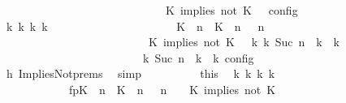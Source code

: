\begin{isabellebody}
\ \ \ \ \ \ \ \ \ \ \ \ \ \ \ \ \ \ \ \ \ \ \ \ \ \ {\isasymturnstile}\ {\isasymPsi}\ {\isasymtriangleright}\ {\isacharparenleft}{\isacharparenleft}K\ implies\ not\ K\ {\isacharhash}\ {\isasymPhi}{\isacharparenright}\ {\isasymrbrakk}\isactrlsub c\isactrlsub o\isactrlsub n\isactrlsub f\isactrlsub i\isactrlsub g{\isacartoucheclose}\isanewline
\ \ \ \ \ \ \ \ \isamarkupfalse%
\ \isamarkupfalse%
\ {\isacartoucheopen}{\isasymexists}{\isasymGamma}\isactrlsub k\ {\isasymPsi}\isactrlsub k\ {\isasymPhi}\isactrlsub k\ k{\isachardot}\ {\isacharparenleft}\isanewline
\ \ \ \ \ \ \ \ \ \ \ \ \ \ \ \ \ \ \ \ \ {\isacharparenleft}{\isacharparenleft}{\isacharparenleft}K\ {\isasymUp}\ n{\isacharparenright}\ {\isacharhash}\ {\isacharparenleft}K\ {\isasymnot}{\isasymUp}\ n{\isacharparenright}\ {\isacharhash}\ {\isasymGamma}{\isacharparenright}{\isacharcomma}\ n\isanewline
\ \ \ \ \ \ \ \ \ \ \ \ \ \ \ \ \ \ \ \ \ \ \ {\isasymturnstile}\ {\isasymPsi}\ {\isasymtriangleright}\ {\isacharparenleft}{\isacharparenleft}K\ implies\ not\ K\ {\isacharhash}\ {\isasymPhi}{\isacharparenright}{\isacharparenright}\ {\isasymhookrightarrow}\isactrlbsup k\isactrlesup \ {\isacharparenleft}{\isasymGamma}\isactrlsub k{\isacharcomma}\ Suc\ n\ {\isasymturnstile}\ {\isasymPsi}\isactrlsub k\ {\isasymtriangleright}\ {\isasymPhi}\isactrlsub k{\isacharparenright}\isanewline
\ \ \ \ \ \ \ \ \ \ \ \ \ \ \ \ \ \ \ \ {\isacharparenright}\ {\isasymand}\ {\isasymrho}\ {\isasymin}\ {\isasymlbrakk}\ {\isasymGamma}\isactrlsub k{\isacharcomma}\ Suc\ n\ {\isasymturnstile}\ {\isasymPsi}\isactrlsub k\ {\isasymtriangleright}\ {\isasymPhi}\isactrlsub k\ {\isasymrbrakk}\isactrlsub c\isactrlsub o\isactrlsub n\isactrlsub f\isactrlsub i\isactrlsub g{\isacartoucheclose}\isanewline
\ \ \ \ \ \ \ \ \ \ \isamarkupfalse%
\ h{}\ ImpliesNot{\isachardot}prems\ \isamarkupfalse%
\ simp\isanewline
\ \ \ \ \ \ \ \ \isamarkupfalse%
\ this\ \isamarkupfalse%
\ {\isasymGamma}\isactrlsub k\ {\isasymPsi}\isactrlsub k\ {\isasymPhi}\isactrlsub k\ k\ \isanewline
\ \ \ \ \ \ \ \ \ \ \ \ fp{\isacharcolon}{\isacartoucheopen}{\isacharparenleft}{\isacharparenleft}{\isacharparenleft}K\ {\isasymUp}\ n{\isacharparenright}\ {\isacharhash}\ {\isacharparenleft}K\ {\isasymnot}{\isasymUp}\ n{\isacharparenright}\ {\isacharhash}\ {\isasymGamma}{\isacharparenright}{\isacharcomma}\ n\ {\isasymturnstile}\ {\isasymPsi}\ {\isasymtriangleright}\ {\isacharparenleft}{\isacharparenleft}K\ implies\ not\ K\ {\isacharhash}\ {\isasymPhi}{\isacharparenright}{\isacharparenright}\isanewline

\end{isabellebody}
